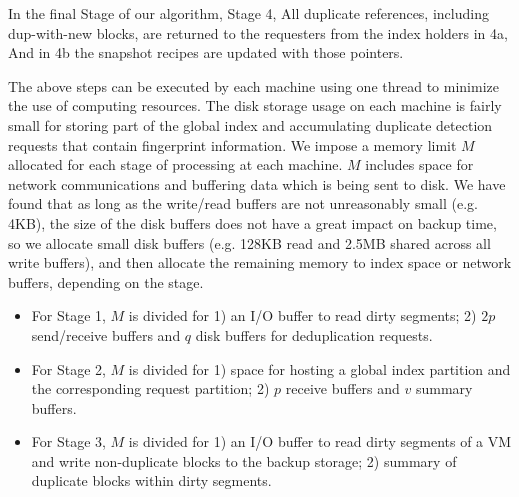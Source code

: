 In the final Stage of our algorithm, Stage 4, All duplicate references,
including dup-with-new blocks, are returned to the requesters from the index
holders in 4a, And in 4b the snapshot recipes are updated with those pointers.


The above steps can be executed by each machine using one thread to minimize
the use of computing resources.
The  disk storage usage on each machine 
is fairly small for  storing part of the global index and
accumulating  duplicate detection requests that contain fingerprint information.   
We impose a memory limit $M$ allocated for each stage of processing at each machine.
$M$ includes space for network communications and buffering data which is being
sent to disk. We have found that as long as the write/read buffers are not
unreasonably small (e.g. 4KB), the size of the disk buffers does not have a
great impact on backup time, so we allocate small disk buffers (e.g. 128KB read
and 2.5MB shared across all write buffers), and then allocate the remaining
memory to index space or network buffers, depending on the stage.
\begin{itemize}
\item For Stage 1, $M$ is divided for 
1) an I/O buffer to read dirty segments; 2) $2p$ send/receive buffers and $q$
disk buffers for deduplication requests.

\item 
For Stage 2, $M$ is divided for 1) space for hosting a global index partition and 
the corresponding request partition; 2) $p$ receive buffers and $v$ summary buffers.

\item For Stage 3, $M$  is divided for 1) an I/O buffer to read dirty segments of a VM and   
write non-duplicate blocks to the  backup storage;
2) summary of duplicate blocks within dirty segments. 
\end{itemize}


